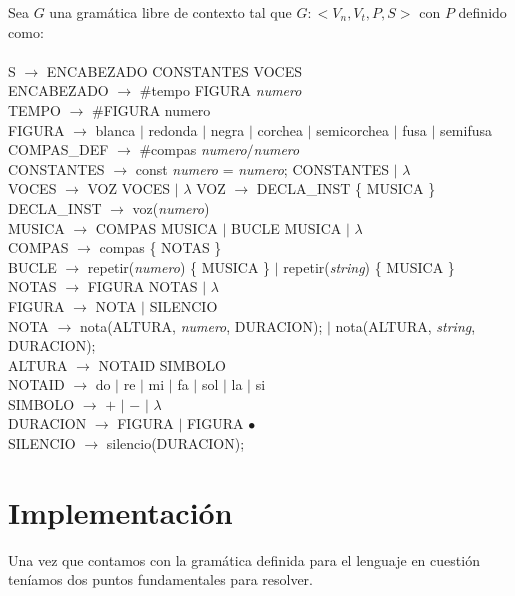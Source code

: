 Sea $G$ una gramática libre de contexto tal que $G: <V_n, V_t, P, S>$ con $P$ definido como: \\
\\
S $\rightarrow$ ENCABEZADO CONSTANTES VOCES \\
ENCABEZADO $\rightarrow$ \#tempo FIGURA \emph{numero} \\
TEMPO $\rightarrow$ \#FIGURA numero \\
FIGURA $\rightarrow$ blanca $\mid$ redonda $\mid$ negra $\mid$ corchea $\mid$ semicorchea $\mid$ fusa $\mid$ semifusa \\
COMPAS\_DEF $\rightarrow$ \#compas \emph{numero}$/$\emph{numero}  \\
CONSTANTES $\rightarrow$ const \emph{numero} = \emph{numero}; CONSTANTES $\mid$ $\lambda$ \\
VOCES $\rightarrow$ VOZ VOCES $\mid$ $\lambda$
VOZ $\rightarrow$ DECLA\_INST \{ MUSICA \} \\
DECLA\_INST $\rightarrow$ voz(\emph{numero}) \\
MUSICA $\rightarrow$ COMPAS MUSICA $\mid$ BUCLE MUSICA $\mid$ $\lambda$ \\
COMPAS $\rightarrow$ compas \{ NOTAS \} \\
BUCLE $\rightarrow$ repetir(\emph{numero}) \{ MUSICA \} $\mid$ repetir(\emph{string}) \{ MUSICA \} \\
NOTAS $\rightarrow$ FIGURA NOTAS $\mid$ $\lambda$ \\
FIGURA $\rightarrow$ NOTA $\mid$ SILENCIO \\
NOTA $\rightarrow$ nota(ALTURA, \emph{numero}, DURACION); $\mid$ nota(ALTURA, \emph{string}, DURACION); \\
ALTURA $\rightarrow$ NOTAID SIMBOLO \\
NOTAID $\rightarrow$ do $\mid$ re $\mid$ mi $\mid$ fa $\mid$ sol $\mid$ la $\mid$ si \\
SIMBOLO $\rightarrow$ $+$ $\mid$ $-$ $\mid$ $\lambda$ \\
DURACION $\rightarrow$ FIGURA $\mid$ FIGURA $\bullet$ \\
SILENCIO $\rightarrow$ silencio(DURACION); \\



\section{Implementación}

Una vez que contamos con la gramática definida para el lenguaje en cuestión teníamos dos puntos fundamentales para resolver. 

